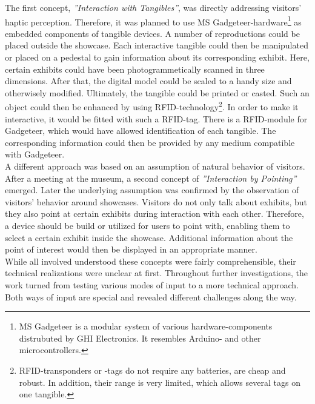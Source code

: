 The first concept, \textit{''Interaction with Tangibles''}, was directly addressing visitors' haptic perception. Therefore, it was planned to use \ac{MS} Gadgeteer-hardware\footnote{\ac{MS} Gadgeteer is a modular system of various hardware-components distrubuted by GHI Electronics. It resembles Arduino- and other microcontrollers.} as embedded components of tangible devices. A number of reproductions could be placed outside the showcase. Each interactive tangible could then be manipulated or placed on a pedestal to gain information about its corresponding exhibit. Here, certain exhibits could have been photogrammetically scanned in three dimensions. After that, the digital model could be scaled to a handy size and otherwisely modified. Ultimately, the tangible could be printed or casted. Such an object could then be enhanced by using \ac{RFID}-technology\footnote{RFID-transponders or -tags do not require any batteries, are cheap and robust. In addition, their range is very limited, which allows several tags on one tangible.}. In order to make it interactive, it would be fitted with such a \ac{RFID}-tag. There is a \ac{RFID}-module for Gadgeteer, which would have allowed identification of each tangible. The corresponding information could then be provided by any medium compatible with Gadgeteer.
\\
A different approach was based on an assumption of natural behavior of visitors. After a meeting at the museum, a second concept of \textit{''Interaction by Pointing''} emerged. Later the underlying assumption was confirmed by the observation of visitors' behavior around showcases. Visitors do not only talk about exhibits, but they also point at certain exhibits during interaction with each other. Therefore, a device should be build or utilized for users to point with, enabling them to select a certain exhibit inside the showcase. Additional information about the point of interest would then be displayed in an appropriate manner. 
\\
While all involved understood these concepts were fairly comprehensible, their technical realizations were unclear at first. Throughout further investigations, the work turned from testing various modes of input to a more technical approach. Both ways of input are special and revealed different challenges along the way.


